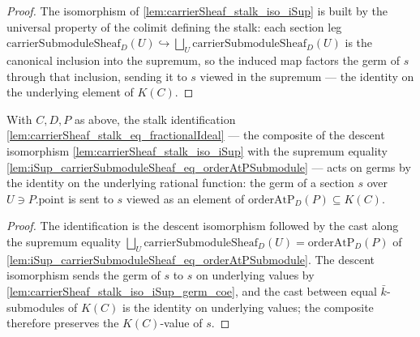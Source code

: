 \begin{proof}
  \leanok
  The isomorphism of \cref{lem:carrierSheaf_stalk_iso_iSup} is built by the
  universal property of the colimit defining the stalk: each section leg
  \(\mathrm{carrierSubmoduleSheaf}_D(U) \hookrightarrow
  \bigsqcup_{U} \mathrm{carrierSubmoduleSheaf}_D(U)\) is the canonical inclusion
  into the supremum, so the induced map factors the germ of \(s\) through that
  inclusion, sending it to \(s\) viewed in the supremum --- the identity on the
  underlying element of \(K(C)\).
\end{proof}


\begin{lemma}
  \label{lem:carrierSheaf_stalk_eq_hom_germ_coe}
  With \(C, D, P\) as above, the stalk identification
  \cref{lem:carrierSheaf_stalk_eq_fractionalIdeal} --- the composite of the
  descent isomorphism \cref{lem:carrierSheaf_stalk_iso_iSup} with the supremum
  equality \cref{lem:iSup_carrierSubmoduleSheaf_eq_orderAtPSubmodule} --- acts on
  germs by the identity on the underlying rational function: the germ of a
  section \(s\) over \(U \ni P.\mathrm{point}\) is sent to \(s\) viewed as an
  element of \(\mathrm{orderAtP}_D(P) \subseteq K(C)\).
\end{lemma}

\begin{proof}
        \leanok
  The identification is the descent isomorphism followed by the cast along the
  supremum equality \(\bigsqcup_{U} \mathrm{carrierSubmoduleSheaf}_D(U) =
  \mathrm{orderAtP}_D(P)\) of
  \cref{lem:iSup_carrierSubmoduleSheaf_eq_orderAtPSubmodule}. The descent
  isomorphism sends the germ of \(s\) to \(s\) on underlying values by
  \cref{lem:carrierSheaf_stalk_iso_iSup_germ_coe}, and the cast between equal
  \(\bar k\)-submodules of \(K(C)\) is the identity on underlying values; the
  composite therefore preserves the \(K(C)\)-value of \(s\).
\end{proof}

